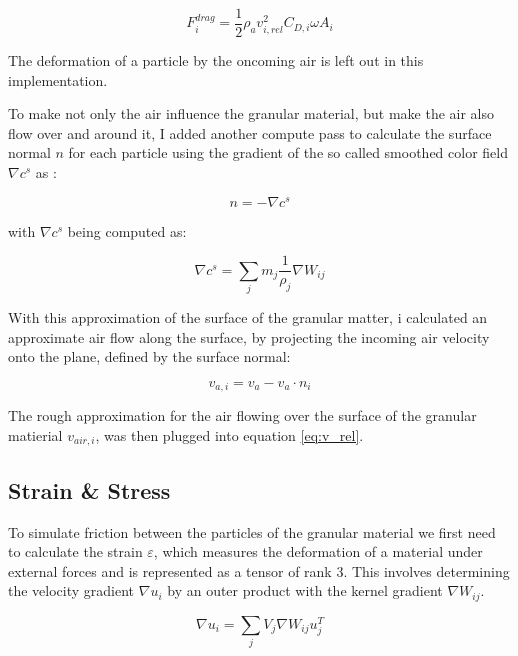 \documentclass[intern]{cgMA}
\begin{document}
    \begin{equation}
        F^{drag}_i = \frac{1}{2}\rho_a v^2_{i,rel} C_{D,i}  \omega  A_i
    \end{equation}

    The deformation of a particle by the oncoming air is left out in this implementation.

    To make not only the air influence the granular material, but make the air also flow over and around it, I added another compute pass to calculate the surface normal $n$ for each particle using the gradient of the so called smoothed color field $\nabla c^s$ as \cite{10.5555/846276.846298}:

    \begin{equation}
        n = -\nabla c^s
    \end{equation}

    with $\nabla c^s$ being computed as: 

    \begin{equation}
        \nabla c^s = \sum_j m_j \frac{1}{\rho_j} \nabla W_{ij}
    \end{equation}

    With this approximation of the surface of the granular matter, i calculated an approximate air flow along the surface, by projecting the incoming air velocity onto the plane, defined by the surface normal:

    \begin{equation}
        v_{a, i} = v_{a} - v_{a} \cdot n_i
    \end{equation}

    The rough approximation for the air flowing over the surface of the granular matierial $v_{air, i}$, was then plugged into equation \ref{eq:v_rel}.

    \subsection{Strain \& Stress}
    
    To simulate friction between the particles of the granular material we first need to calculate the strain $\varepsilon$, which measures the deformation of a material under external forces and is represented as a tensor of rank 3. This involves determining the velocity gradient $\nabla u_i$ by an outer product with the kernel gradient $\nabla W_{ij}$. 
    
    \begin{equation}
        \nabla u_i = \sum_j V_j \nabla W_{ij} u_j^T
    \end{equation}
\end{document}
